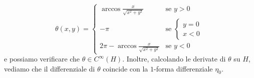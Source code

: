 \begin{remark}
\begin{equation*}
\theta(x, y) = \begin{cases}
	\arccos{\frac{x}{\sqrt{x^2 + y^2}}} & \text{se } y > 0 \\
	-\pi & \text{se } \begin{cases} y = 0 \\ x < 0 \end{cases} \\
	2 \pi - \arccos{\frac{x}{\sqrt{x^2+y^2}}} & \text{se } y < 0 
\end{cases}
\end{equation*}
e possiamo verificare che $\theta \in C^\infty(H)$. Inoltre, calcolando le derivate di $\theta$ su $H$, vediamo che il differenziale di $\theta$ coincide con la $1$-forma differenziale $\eta_0$.
\end{remark}

